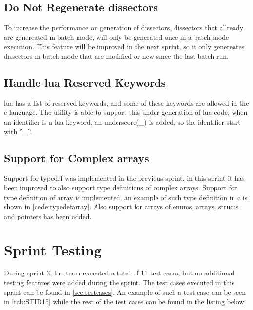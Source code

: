 \subsection{Do Not Regenerate \glspl{dissector}}
To increase the performance on generation of \glspl{dissector}, \glspl{dissector} that 
allready are genereated in \gls{batch mode}, will only be generated once in a batch 
mode execution. This feature will be improved in the next sprint, so it only 
genereates \glspl{dissector} in \gls{batch mode} that are modified or new since the last 
batch run.

\subsection{Handle \Gls{lua} Reserved Keywords}
\Gls{lua} has a list of reserved keywords, and some of these keywords are allowed in 
the \Gls{c} language. The \gls{utility} is able to support this under generation of \Gls{lua} 
code, when an identifier is a lua keyword, an underscore(\_) is added, so the 
identifier start with ''\_''.

\subsection{Support for Complex \Glspl{array}}
Support for typedef was implemented in the previous sprint, in this sprint it 
has been improved to also support type definitions of complex \glspl{array}. Support 
for type definition of array is implemented, an example of such type 
definition in \Gls{c} is shown in \autoref{code:typedefarray}. Also support for 
\glspl{array} of \glspl{enum}, \glspl{array}, \glspl{struct} and pointers has been added.




\section{Sprint Testing}
\label{sec:sp3:test}
During sprint 3, the team executed a total of 11 test cases, but no additional testing features were added during the sprint. The test cases executed in this sprint can be found in \autoref{sec:testcases}. An example of such a test case can be seen in \autoref{tab:STID15} while the rest of the test cases can be found in the listing below:

